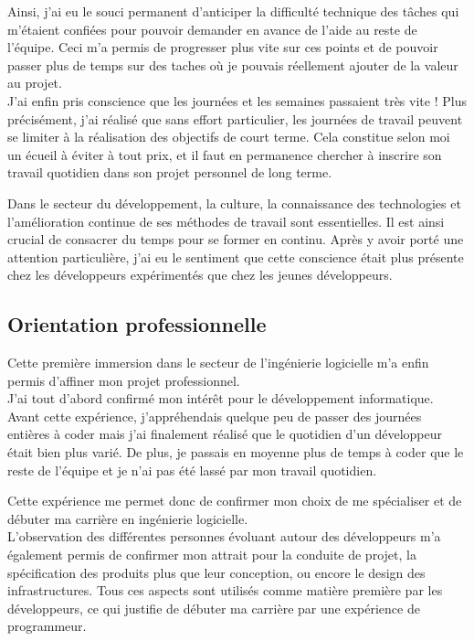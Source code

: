 \documentclass[11pt, oneside, titlepage, a4paper]{article}
\begin{document}
Ainsi, j'ai eu le souci permanent d'anticiper la difficulté technique des tâches qui m'étaient confiées pour pouvoir demander en avance de l'aide au reste de l'équipe. Ceci m'a permis de progresser plus vite sur ces points et de pouvoir passer plus de temps sur des taches où je pouvais réellement ajouter de la valeur au projet.
\\

J'ai enfin pris conscience que les journées et les semaines passaient très vite ! Plus précisément, j'ai réalisé que sans effort particulier, les journées de travail peuvent se limiter à la réalisation des objectifs de court terme. Cela constitue selon moi un écueil à éviter à tout prix, et il faut en permanence chercher à inscrire son travail quotidien dans son projet personnel de long terme.

Dans le secteur du développement, la culture, la connaissance des technologies et l'amélioration continue de ses méthodes de travail sont essentielles. Il est ainsi crucial de consacrer du temps pour se former en continu. Après y avoir porté une attention particulière, j'ai eu le sentiment que cette \og conscience \fg{} était plus présente chez les développeurs expérimentés que chez les jeunes développeurs.
	\subsection{Orientation professionnelle}
Cette première immersion dans le secteur de l'ingénierie logicielle m'a enfin permis d'affiner mon projet professionnel.
\\

J'ai tout d'abord confirmé mon intérêt pour le développement informatique. Avant cette expérience, j'appréhendais quelque peu de passer des journées entières à coder mais j'ai finalement réalisé que le quotidien d'un développeur était bien plus varié. De plus, je passais en moyenne plus de temps à coder que le reste de l'équipe et je n'ai pas été \og lassé \fg{} par mon travail quotidien.

Cette expérience me permet donc de confirmer mon choix de me spécialiser et de débuter ma carrière en ingénierie logicielle.
\\

L'observation des différentes personnes évoluant autour des développeurs m'a également permis de confirmer mon attrait pour la conduite de projet, la spécification des produits plus que leur conception, ou encore le design des infrastructures. Tous ces aspects sont utilisés comme \og matière première\fg{} par les développeurs, ce qui justifie de débuter ma carrière par une expérience de programmeur.
\end{document}
